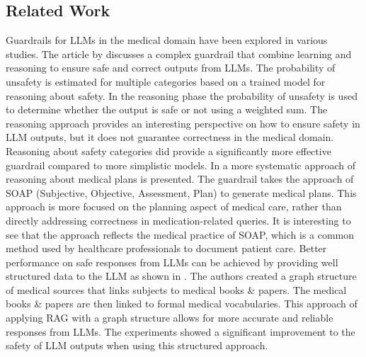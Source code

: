 %

\subsection{Related Work}
Guardrails for LLMs in the medical domain have been explored in various studies.
The article by \citep{kang2024r} discusses a complex guardrail that combine learning and reasoning to ensure safe and correct outputs from LLMs.
The probability of unsafety is estimated for multiple categories based on a trained model for reasoning about safety.
In the reasoning phase the probability of unsafety is used to determine whether the output is safe or not using a weighted sum.
The reasoning approach provides an interesting perspective on how to ensure safety in LLM outputs, but it does not guarantee correctness in the medical domain.
Reasoning about safety categories did provide a significantly more effective guardrail compared to more simplistic models.
In \citep{hsu2025medplan} a more systematic approach of reasoning about medical plans is presented.
The guardrail takes the approach of SOAP (Subjective, Objective, Assessment, Plan) to generate medical plans.
This approach is more focused on the planning aspect of medical care, rather than directly addressing correctness in medication-related queries.
It is interesting to see that the approach reflects the medical practice of SOAP, which is a common method used by healthcare professionals to document patient care.
Better performance on safe responses from LLMs can be achieved by providing well structured data to the LLM as shown in \citep{wu2024medical}.
The authors created a graph structure of medical sources that links subjects to medical books \& papers.
The medical books \& papers are then linked to formal medical vocabularies.
This approach of applying RAG with a graph structure allows for more accurate and reliable responses from LLMs.
The experiments showed a significant improvement to the safety of LLM outputs when using this structured approach.